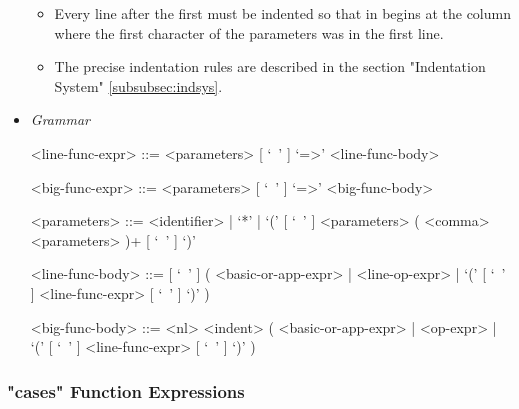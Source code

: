 \documentclass{article}
\begin{document}
\begin{itemize}
\begin{itemize}
\item
Every line after the first must be indented so that in begins at the column
where the first character of the parameters was in the first line.

\item
The precise indentation rules are described in the section
"Indentation System" \ref{subsubsec:indsys}.
\end{itemize}

\item \textit{Grammar}
\begin{grammar}
<line-func-expr> ::= <parameters> [ `\ ' ] `=>' <line-func-body>

<big-func-expr> ::= <parameters> [ `\ ' ] `=>' <big-func-body>

<parameters> ::=
<identifier> | `*' |
`(' [ `\ ' ] <parameters> ( <comma> <parameters> )+ [ `\ ' ] `)'

<line-func-body> ::=
[ `\ ' ]
(
<basic-or-app-expr> | <line-op-expr> |
`(' [ `\ ' ] <line-func-expr> [ `\ ' ] `)'
)

<big-func-body> ::=
<nl> <indent>
(
<basic-or-app-expr> | <op-expr> | `(' [ `\ ' ] <line-func-expr> [ `\ ' ] `)'
)
\end{grammar}
\end{itemize}

\subsubsection{"cases" Function Expressions}
\label{subsubsec:casessyntax}
\end{document}
